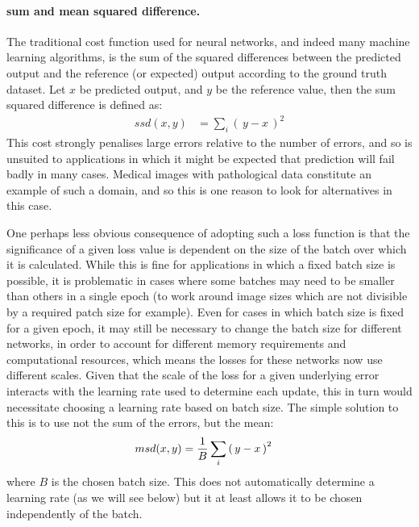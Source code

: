\documentclass[msc]{infthesis}
\newcommand{\of}[1]{\left(\,{#1}\,\right)}
\begin{document}
\paragraph*{sum and mean squared difference.}
\label{sec:classification:2-3-1}
%
The traditional cost function used for neural networks, and indeed many machine learning
algorithms, is the sum of the squared differences between the predicted output and the reference
(or expected) output according to the ground truth dataset.
%
Let \(x\) be predicted output, and \(y\) be the reference value, then the sum squared difference
is defined as:
%
\begin{align}
ssd( x, y )
&=
\sum_{i} \of{ y - x }^2
\end{align}
%
This cost strongly penalises large errors relative to the number of errors, and so is unsuited to 
applications in which it might be expected that prediction will fail badly in many cases.  Medical
images with pathological data constitute an example of such a domain, and so this is one reason
to look for alternatives in this case.

One perhaps less obvious consequence of adopting such a loss function is that the significance of
a given loss value is dependent on the size of the batch over which it is calculated.  While this
is fine for applications in which a fixed batch size is possible, it is problematic in cases where
some batches may need to be smaller than others in a single epoch (to work around image sizes which
are not divisible by a required patch size for example).  Even for cases in which batch size is
fixed for a given epoch, it may still be necessary to change the batch size for different networks,
in order to account for different memory requirements and computational resources, which means the
losses for these networks now use different scales.  Given that the scale of the loss for a given
underlying error interacts with the learning rate used to determine each update, this in turn would
necessitate choosing a learning rate based on batch size.  The simple solution to this is to use not
the sum of the errors, but the mean:
\begin{align}
msd( x, y )
&=
{1 \over B} \sum_{i} \of{ y - x }^2
\end{align}
where \(B\) is the chosen batch size.  This does not automatically determine a learning rate (as we
will see below) but it at least allows it to be chosen independently of the batch.
\end{document}
